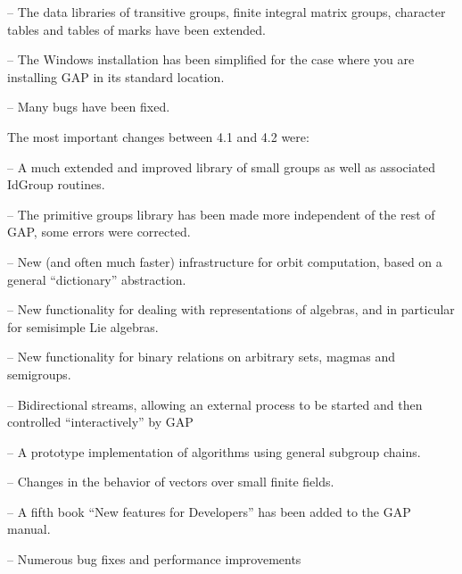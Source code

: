 \item{--}
The data libraries of transitive groups, finite integral matrix groups,
character tables and tables of marks have been extended.

\item{--}
The Windows installation has been simplified for the case where you
are installing GAP in its standard location.

\item{--}
Many bugs have been fixed.

\endlist


The most important changes between {\GAP} 4.1 and {\GAP} 4.2 were:

\beginlist%
\item{--}
A much extended and improved library of small groups as well as
associated IdGroup routines.

\item{--}
The primitive groups library has been made more independent of the
rest of GAP, some errors were corrected.

\item{--}
New (and often much faster) infrastructure for orbit computation, based on a
general ``dictionary'' abstraction.

\item{--}
New functionality for dealing with representations of algebras, and
in particular for semisimple Lie algebras. 

\item{--}
New functionality for binary relations on arbitrary sets, magmas and
semigroups.

\item{--}
Bidirectional streams, allowing an external process to be started and then
controlled ``interactively'' by GAP 

\item{--}
A prototype implementation of algorithms using general subgroup chains.

\item{--}
Changes in the behavior of vectors over small finite fields.

\item{--}
A fifth book ``New features for Developers'' has been added to the GAP manual.

\item{--}
Numerous bug fixes and performance improvements 
\endlist



